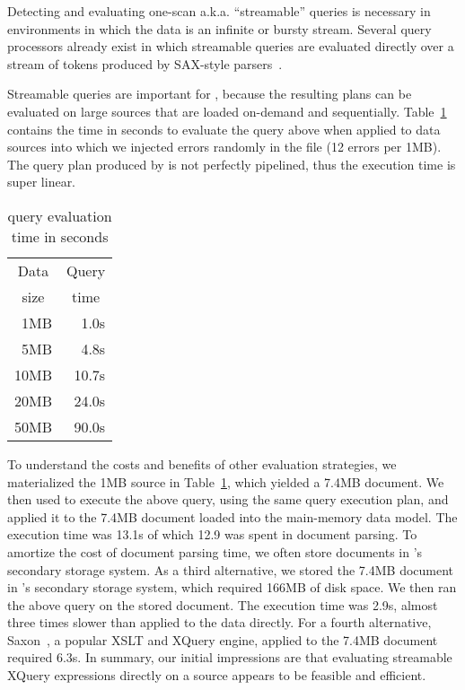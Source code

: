 Detecting and evaluating one-scan a.k.a. ``streamable'' queries is
necessary in \Xml{} environments in which the \Xml{} data is an
infinite or bursty stream.  Several query processors already exist in
which streamable queries are evaluated directly over a stream of
tokens produced by SAX-style
parsers~\cite{DBLP:journals/vldb/FlorescuHKLRWCS04,rose:villard:2005}.

Streamable queries are important for \padx{}, because the resulting
plans can be evaluated on large \pads{} sources that are loaded
on-demand and sequentially.  Table~\ref{tab:linear} contains the time
in seconds to evaluate the query above when applied to \pads{} data
sources into which we injected errors randomly in the file
(12 errors per 1MB).  The query plan produced
by \Galax{} is not perfectly pipelined, thus the execution time is super
linear.  
\begin{table}
\begin{center}
\begin{tabular}{r|r}
\multicolumn{1}{c|}{Data}  & \multicolumn{1}{c}{Query}   \\
\multicolumn{1}{c|}{size}  & \multicolumn{1}{c}{time} \\ \hline
  1MB                      &  1.0s                        \\
  5MB                      &  4.8s                        \\
 10MB                      & 10.7s                        \\
 20MB                      & 24.0s                        \\
 50MB                      & 90.0s                        \\
\end{tabular}
\end{center}
\caption{\padx{} query evaluation time in seconds}
\label{tab:linear}
\end{table}

To understand the costs and benefits of other evaluation strategies,
we materialized the 1MB \pads{} source in Table~\ref{tab:linear},
which yielded a 7.4MB \Xml{} document.  We then used \Galax{} to
execute the above query, using the same query execution plan, and
applied it to the 7.4MB \Xml{} document loaded into the main-memory
data model.  The execution time was 13.1s of which 12.9 was spent in
document parsing.  To amortize the cost of document parsing time, we
often store documents in \Galax{}'s secondary storage system.  As a
third alternative, we stored the 7.4MB \Xml{} document in \Galax{}'s
secondary storage system, which required 166MB of disk space.  We then
ran the above query on the stored document.  The execution time was
2.9s, almost three times slower than \padx{} applied to the \pads{}
data directly.  For a fourth alternative, Saxon~\cite{saxon}, a
popular XSLT and XQuery engine, applied to the 7.4MB document required
6.3s.  In summary, our initial impressions are that evaluating
streamable XQuery expressions directly on a \pads{} source appears to
be feasible and efficient.

